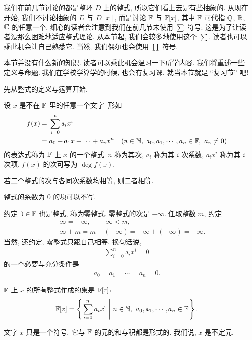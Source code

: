 \subsection*{\PolynomialsOverF}
\markright{\PolynomialsOverF}

我们在前几节讨论的都是整环 $D$ 上的整式, 所以它们看上去是有些抽象的. 从现在开始, 我们不讨论抽象的 $D$ 与 $D[x]$, 而是讨论 $\mathbb{F}$ 与 $\mathbb{F}[x]$, 其中 $\mathbb{F}$ 可代指 $\mathbb{Q}$, $\mathbb{R}$, $\mathbb{C}$ 的任意一个. 细心的读者会注意到我们在前几节未使用 $\sum$ 符号: 这是为了让读者没那么困难地适应整式理论. 从本节起, 我们会较多地使用这个 $\sum$. 读者也可以乘此机会让自己熟悉它. 当然, 我们偶尔也会使用 $\prod$ 符号.

本节并没有什么新的知识. 读者可以乘此机会温习一下所学内容. 我们将重述一些定义与命题. 我们在学校学算学的时候, 也会有复习课. 就当本节就是 ``复习节'' 吧!

先从整式的定义与运算开始.

\begin{definition}
    设 $x$ 是不在 $\mathbb{F}$ 里的任意一个文字. 形如
    \begin{align*}
        f(x)
        = {} & \sum_{i=0}^n a_i x^i                                                                       \\
        = {} & a_0 + a_1 x + \cdots + a_n x^n \quad (n \in \NN,\ a_0,a_1,\cdots,a_n \in \FF,\ a_n \neq 0)
    \end{align*}
    的表达式称为 $\mathbb{F}$ 上 $x$ 的一个整式. $n$ 称为其次, $a_i$ 称为其 $i$ 次系数, $a_i x^i$ 称为其 $i$ 次项. $f(x)$ 的次可写为 $\deg f(x)$.

    若二个整式的次与各同次系数均相等, 则二者相等.

    整式的系数为 $0$ 的项可以不写.

    约定 $0 \in \mathbb{F}$ 也是整式, 称为零整式. 零整式的次是 $-\infty$. 任取整数 $m$, 约定
    \begin{align*}
         & -\infty = -\infty, \quad -\infty < m,                        \\
         & -\infty + m = m + (-\infty) = -\infty + (-\infty) = -\infty.
    \end{align*}
    当然, 还约定, 零整式只跟自己相等. 换句话说,
    \begin{align*}
        \sum_{i=0}^n a_i x^i = 0
    \end{align*}
    的一个必要与充分条件是
    \begin{align*}
        a_0 = a_1 = \cdots = a_n = 0.
    \end{align*}

    $\mathbb{F}$ 上 $x$ 的所有整式作成的集是 $\mathbb{F}[x]$:
    \begin{align*}
        \mathbb{F}[x] = \left\{\, \sum_{i=0}^n a_i x^i \,\,\middle|\,\, n \in \mathbb{N},\ a_0,a_1,\cdots,a_n \in \mathbb{F} \,\right\}.
    \end{align*}

    文字 $x$ 只是一个符号, 它与 $\mathbb{F}$ 的元的和与积都是形式的. 我们说, $x$ 是不定元.
\end{definition}

